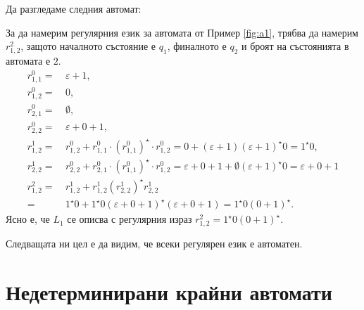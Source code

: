 \begin{example}
  \label{fig:a1}
  Да разгледаме следния автомат:
  
  \begin{figure}[H]
    \begin{center}
      \end{center}
 \end{figure}

 За да намерим регулярния език за автомата от Пример \ref{fig:a1}, 
 трябва да намерим $r^2_{1,2}$, защото началното състояние е $q_1$, финалното е $q_2$ и 
 броят на състоянията в автомата е $2$.
 \begin{align*}
   r^0_{1,1} =\ & \varepsilon + 1,\\
   r^0_{1,2} =\ & 0,\\
   r^0_{2,1} =\ & \emptyset,\\
   r^0_{2,2} =\ & \varepsilon +  0 + 1,\\
    r^1_{1,2} =\ & r^0_{1,2} + r^0_{1,1}\cdot(r^0_{1,1})^\star \cdot r^0_{1,2} = 0 + (\varepsilon + 1)(\varepsilon + 1)^\star0 = 1^\star0,\\
    r^1_{2,2} =\ & r^0_{2,2} + r^0_{2,1} \cdot (r^0_{1,1})^\star\cdot r^0_{1,2} = \varepsilon + 0 + 1 + \emptyset(\varepsilon + 1)^\star0 = \varepsilon + 0 + 1\\
    r^2_{1,2} =\ & r^{1}_{1,2} + r^{1}_{1,2}(r^1_{2,2})^\star r^1_{2,2} \\
    =\ & 1^\star0 + 1^\star0 (\varepsilon + 0 + 1)^\star (\varepsilon + 0 + 1) = 1^\star 0 (0 + 1)^\star.
  \end{align*}
Ясно е, че $L_1$ се описва с регулярния израз $r^2_{1,2} = 1^\star 0 (0 + 1)^\star$.
\end{example}

Следващата ни цел е да видим, че всеки регулярен език е автоматен.

\section{Недетерминирани крайни автомати}

